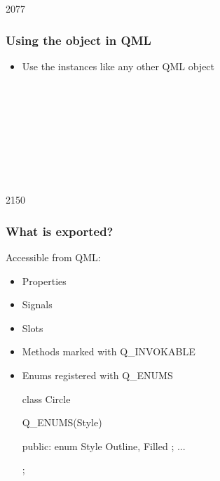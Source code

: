 
\begin{slide}[fragile]{2077}\frametitle{Using the object in QML}

%
\begin{itemize}
\item Use the instances like any other QML object\\[5mm]

\footnotesize
{}\\
\\
\\
\qtt{\}}\\
\vspace*{0.5em}
\\
\\
\\
\qtt{\}}\\
\end{itemize}
\end{slide}

\begin{slide}[fragile]{2150}\frametitle{What is exported?}
 Accessible from QML:
    \begin{itemize}
    \item Properties
    \item Signals
    \item Slots
    \item Methods marked with Q\_INVOKABLE
    \item Enums registered with Q\_ENUMS
      \begin{cpp}
class Circle {
  Q_ENUMS(Style)

public:
  enum Style { Outline, Filled };
  ...
};
      \end{cpp}
    \end{itemize}
\end{slide}
